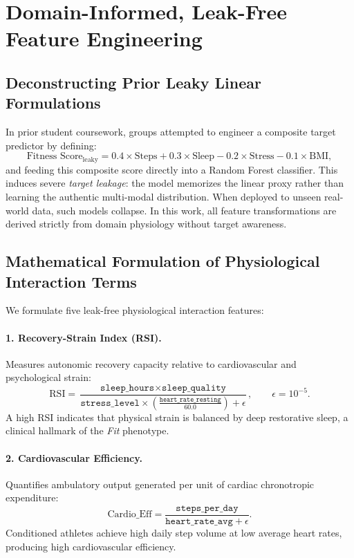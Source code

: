 \documentclass[11pt,a4paper]{article}
\begin{document}
\section{Domain-Informed, Leak-Free Feature Engineering}

\subsection{Deconstructing Prior Leaky Linear Formulations}
In prior student coursework, groups attempted to engineer a composite target predictor by defining:
\begin{equation}
\text{Fitness Score}_{\text{leaky}} = 0.4 \times \text{Steps} + 0.3 \times \text{Sleep} - 0.2 \times \text{Stress} - 0.1 \times \text{BMI},
\end{equation}
and feeding this composite score directly into a Random Forest classifier. This induces severe \emph{target leakage}: the model memorizes the linear proxy rather than learning the authentic multi-modal distribution. When deployed to unseen real-world data, such models collapse. In this work, all feature transformations are derived strictly from domain physiology without target awareness.

\subsection{Mathematical Formulation of Physiological Interaction Terms}
We formulate five leak-free physiological interaction features:

\paragraph{1. Recovery-Strain Index (RSI).} Measures autonomic recovery capacity relative to cardiovascular and psychological strain:
\begin{equation}
\mathrm{RSI} = \frac{\texttt{sleep\_hours} \times \texttt{sleep\_quality}}{\texttt{stress\_level} \times \left( \frac{\texttt{heart\_rate\_resting}}{60.0} \right) + \epsilon}, \qquad \epsilon = 10^{-5}.
\end{equation}
A high RSI indicates that physical strain is balanced by deep restorative sleep, a clinical hallmark of the \emph{Fit} phenotype.

\paragraph{2. Cardiovascular Efficiency.} Quantifies ambulatory output generated per unit of cardiac chronotropic expenditure:
\begin{equation}
\mathrm{Cardio\_Eff} = \frac{\texttt{steps\_per\_day}}{\texttt{heart\_rate\_avg} + \epsilon}.
\end{equation}
Conditioned athletes achieve high daily step volume at low average heart rates, producing high cardiovascular efficiency.
\end{document}
